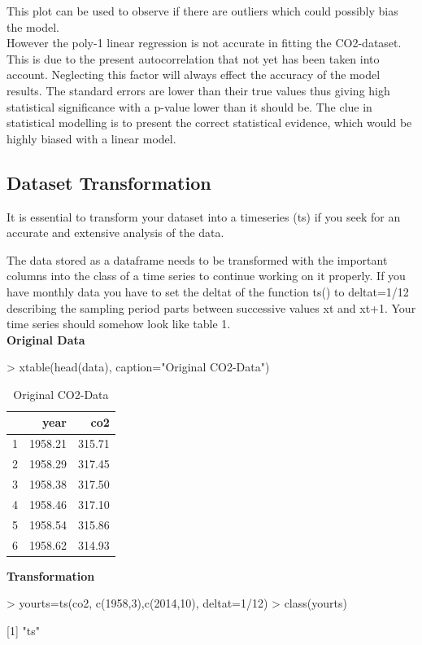 \documentclass[11pt, a4paper]{article} %
\begin{document}
\noindent This plot can be used to observe if there are outliers which could possibly bias the model. \\
However the poly-1 linear regression is not accurate in fitting the CO2-dataset. This is due to the present autocorrelation that not yet has been taken into account. Neglecting this factor will always effect the accuracy of the model results. The standard errors are lower than  their true values thus giving high statistical significance with a p-value lower than it should be. The clue in statistical modelling is to present the correct statistical evidence, which would be highly biased with a linear model.\\
\subsection{Dataset Transformation}
It is essential to transform your dataset into a timeseries (ts) if you seek for an accurate and extensive analysis of the data.

\noindent The data stored as a dataframe needs to be transformed with the important columns into the class of a time series to continue working on it properly. If you have monthly data you have to set the deltat of the function ts() to deltat=1/12 describing the sampling period parts between successive values xt and xt+1. Your time series should somehow look like table 1.\\

\noindent \textbf{Original Data}\\
\begin{Schunk}
\begin{Sinput}
> xtable(head(data), caption="Original CO2-Data")
\end{Sinput}
\begin{table}[ht]
\centering
\begin{tabular}{rrr}
  \hline
 & year & co2 \\ 
  \hline
1 & 1958.21 & 315.71 \\ 
  2 & 1958.29 & 317.45 \\ 
  3 & 1958.38 & 317.50 \\ 
  4 & 1958.46 & 317.10 \\ 
  5 & 1958.54 & 315.86 \\ 
  6 & 1958.62 & 314.93 \\ 
   \hline
\end{tabular}
\caption{Original CO2-Data} 
\end{table}\end{Schunk}
\noindent \textbf{Transformation}\\
\begin{Schunk}
\begin{Sinput}
> yourts=ts(co2, c(1958,3),c(2014,10), deltat=1/12)
> class(yourts)
\end{Sinput}
[1] "ts"\end{Schunk}
\end{document}
